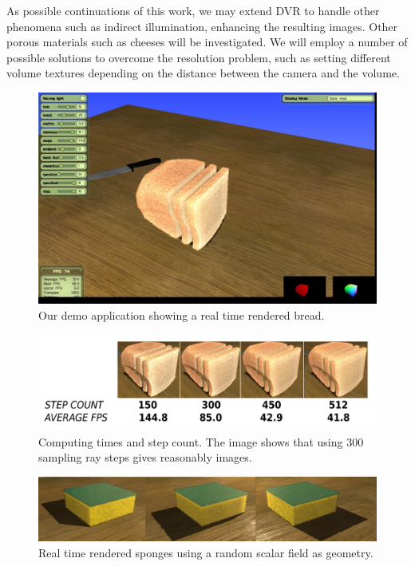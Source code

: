 As possible continuations of this work, we may extend DVR to handle other phenomena such as indirect illumination, enhancing the resulting images.
Other porous materials such as cheeses will be investigated.
We will employ a number of possible solutions to overcome the resolution problem, such as setting different volume textures depending on the distance between the camera and the volume. 



\begin{figure}
  \centerline{\includegraphics[width=13cm]{figures/application}}
  \caption{Our demo application showing a real time rendered bread.}
  \label{fg:application}
\end{figure}

\begin{figure}
  \centerline{\includegraphics[width=13cm]{figures/stepcount}}
  \caption{Computing times and step count. The image shows that using $300$ sampling ray steps gives reasonably images. }
  \label{fg:stepcount}
\end{figure}

\begin{figure}
  \centerline{\includegraphics[width=13cm]{figures/sponges}}
  \caption{Real time rendered sponges using a random scalar field as geometry.}
  \label{fg:sponges}
\end{figure}


